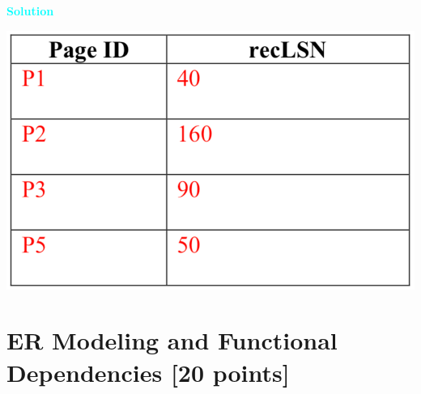 \documentclass[10pt]{article}
\newenvironment{solution}
    { \begin{mdframed}[backgroundcolor=gray!10] \textcolor{cyan}{\textbf{Solution}} \\}
    {  \end{mdframed}}
\begin{document}
\begin{enumerate}
\begin{itemize}
		            \begin{solution}
			            \begin{center}
				            \includegraphics[width=.45\linewidth]{DPT_sol.png}
			            \end{center}
		            \end{solution}
	      \end{itemize}

\end{enumerate}




\newpage
\section{ER Modeling and Functional Dependencies \textbf{[20 points]}}
\end{document}
